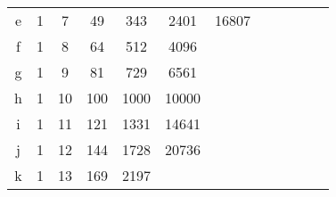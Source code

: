 \documentclass[review,12pt]{elsarticle}
\begin{document}
\begin{table}[htbp!]
\begin{tabular}{cccccccccccc}
\multicolumn{1}{|c|}{e}                  & \multicolumn{1}{c|}{1} & \multicolumn{1}{c|}{7}  & \multicolumn{1}{c|}{49}  & \multicolumn{1}{c|}{343}   & \multicolumn{1}{c|}{2401}  & \multicolumn{1}{c|}{16807} &                            &                            &                           &                            &                            \\ \cline{1-7}
\multicolumn{1}{|c|}{f}                  & \multicolumn{1}{c|}{1} & \multicolumn{1}{c|}{8}  & \multicolumn{1}{c|}{64}  & \multicolumn{1}{c|}{512}   & \multicolumn{1}{c|}{4096}  &                            &                            &                            &                           &                            &                            \\ \cline{1-6}
\multicolumn{1}{|c|}{g}                  & \multicolumn{1}{c|}{1} & \multicolumn{1}{c|}{9}  & \multicolumn{1}{c|}{81}  & \multicolumn{1}{c|}{729}   & \multicolumn{1}{c|}{6561}  &                            &                            &                            &                           &                            &                            \\ \cline{1-6}
\multicolumn{1}{|c|}{h}                  & \multicolumn{1}{c|}{1} & \multicolumn{1}{c|}{10} & \multicolumn{1}{c|}{100} & \multicolumn{1}{c|}{1000}  & \multicolumn{1}{c|}{10000} &                            &                            &                            &                           &                            &                            \\ \cline{1-6}
\multicolumn{1}{|c|}{i}                  & \multicolumn{1}{c|}{1} & \multicolumn{1}{c|}{11} & \multicolumn{1}{c|}{121} & \multicolumn{1}{c|}{1331}  & \multicolumn{1}{c|}{14641} &                            &                            &                            &                           &                            &                            \\ \cline{1-6}
\multicolumn{1}{|c|}{j}                  & \multicolumn{1}{c|}{1} & \multicolumn{1}{c|}{12} & \multicolumn{1}{c|}{144} & \multicolumn{1}{c|}{1728}  & \multicolumn{1}{c|}{20736} &                            &                            &                            &                           &                            &                            \\ \cline{1-6}
\multicolumn{1}{|c|}{k}                  & \multicolumn{1}{c|}{1} & \multicolumn{1}{c|}{13} & \multicolumn{1}{c|}{169} & \multicolumn{1}{c|}{2197}  &                            &                            &                            &                            &                           &                            &                            \\ \cline{1-5}

\end{tabular}
\end{table}
\end{document}
